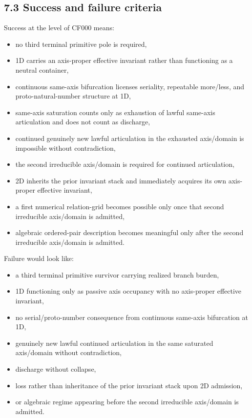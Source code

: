 \documentclass[11pt]{article}
\begin{document}
\subsection{7.3 Success and failure criteria}\label{success-and-failure-criteria}

Success at the level of CF000 means:

\begin{itemize}
\item
  no third terminal primitive pole is required,
\item
  1D carries an axis-proper effective invariant rather than functioning as a neutral container,
\item
  continuous same-axis bifurcation licenses seriality, repeatable more/less, and proto-natural-number structure at 1D,
\item
  same-axis saturation counts only as exhaustion of lawful same-axis articulation and does not count as discharge,
\item
  continued genuinely new lawful articulation in the exhausted axis/domain is impossible without contradiction,
\item
  the second irreducible axis/domain is required for continued articulation,
\item
  2D inherits the prior invariant stack and immediately acquires its own axis-proper effective invariant,
\item
  a first numerical relation-grid becomes possible only once that second irreducible axis/domain is admitted,
\item
  algebraic ordered-pair description becomes meaningful only after the second irreducible axis/domain is admitted.
\end{itemize}

Failure would look like:

\begin{itemize}
\item
  a third terminal primitive survivor carrying realized branch burden,
\item
  1D functioning only as passive axis occupancy with no axis-proper effective invariant,
\item
  no serial/proto-number consequence from continuous same-axis bifurcation at 1D,
\item
  genuinely new lawful continued articulation in the same saturated axis/domain without contradiction,
\item
  discharge without collapse,
\item
  loss rather than inheritance of the prior invariant stack upon 2D admission,
\item
  or algebraic regime appearing before the second irreducible axis/domain is admitted.
\end{itemize}
\end{document}
